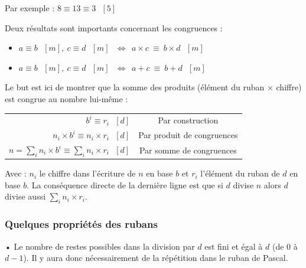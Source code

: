\documentclass[a4paper, twoside]{article}
\begin{document}
		Par exemple : $8 \equiv 13 \equiv 3 ~~~ [5]$
		
	\vspace{2 mm}
		
		Deux résultats sont importants concernant les congruences :

	\begin{itemize}
		\item[] $a \equiv b ~~~ [m], ~ c \equiv d ~~~ [m] ~~~ \Longleftrightarrow ~~ a \times c ~ \equiv ~ b \times d ~~~ [m]$
		\item[] $a \equiv b ~~~ [m], ~ c \equiv d ~~~ [m] ~~~ \Longleftrightarrow ~~ a + c ~ \equiv ~ b + d ~~~ [m]$
	\end{itemize}	

	\vspace{2 mm}

		Le but est ici de montrer que la somme des produits (élément du ruban $\times$ chiffre) est congrue au nombre lui-même : 
		
	\begin{tabular}{rc}

	$b^i \equiv r_i ~~~ [d]$ & Par construction\\
	$n_i \times b^i \equiv n_i \times r_i ~~~ [d]$ & Par produit de congruences\\
	$n = \sum\limits_i n_i \times b^i \equiv \sum\limits_i n_i \times r_i ~~~ [d]$ & Par somme de congruences\\

	\end{tabular}

	\vspace{2 mm}

		Avec : $n_i$ le chiffre dans l'écriture de $n$ en base $b$ et $r_i$ l'élément du ruban de $d$ en base $b$.
	La conséquence directe de la dernière ligne est que si $d$ divise $n$ alors $d$ divise aussi $\sum\limits_i n_i \times r_i$.\\

	\vfill



	\subsubsection*{Quelques propriétés des rubans}\label{ruban_proprietes}

		• Le nombre de restes possibles dans la division par $d$ est fini et égal à $d$ (de $0$ à $d - 1$). Il y aura donc nécessairement de la répétition dans le ruban de Pascal.
\end{document}
